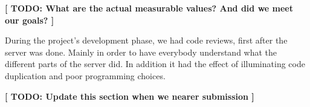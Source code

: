 \textbf{[ TODO: What are the actual measurable values? And did we meet our goals? ]}

During the project's development phase, we had code reviews, first after the server was done. Mainly in order to have everybody understand what the different parts of the server did. In addition it had the effect of illuminating code duplication and poor programming choices.

\textbf{[ TODO: Update this section when we nearer submission ]}
